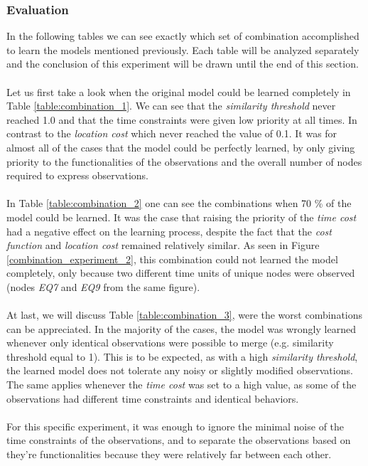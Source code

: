 \subsubsection{Evaluation}
In the following tables we can see exactly which set of combination accomplished to learn the models mentioned previously. Each table will be analyzed separately and the conclusion of this experiment will be drawn until the end of this section.\\ \\
%
Let us first take a look when the original model could be learned completely in Table \ref{table:combination_1}. We can see that  the \textit{similarity threshold} never reached 1.0 and that the time constraints were given low priority at all times. In contrast to the \textit{location cost} which never reached the value of 0.1. It was for almost all of the cases that the model could be perfectly learned, by only giving priority to the functionalities of the observations and the overall number of nodes required to express observations. \\ \\
%
In Table \ref{table:combination_2} one can see the combinations when 70 \% of the model could be learned. It was the case that raising the priority of the \textit{time cost} had a negative effect on the learning process, despite the fact that the \textit{cost function} and \textit{location cost} remained relatively similar.  As seen in Figure \ref{combination_experiment_2}, this combination could not learned the model completely, only because two different time units of unique nodes were observed (nodes \textit{EQ7} and \textit{EQ9} from the same figure). \\ \\
%
At last, we will discuss Table \ref{table:combination_3}, were the worst combinations can be appreciated. In the majority of the cases, the model was wrongly learned whenever only identical observations were possible to merge (e.g. similarity threshold equal to 1). This is to be expected, as with a high \textit{similarity threshold}, the learned model does not tolerate any noisy or slightly modified observations. The same applies whenever the \textit{time cost} was set to a high value, as some of the observations had different time constraints and identical behaviors.  \\ \\
%
For this specific experiment, it was enough to ignore the minimal noise of the time constraints of the observations, and to separate the observations based on they're functionalities because they were relatively far between each other. 

